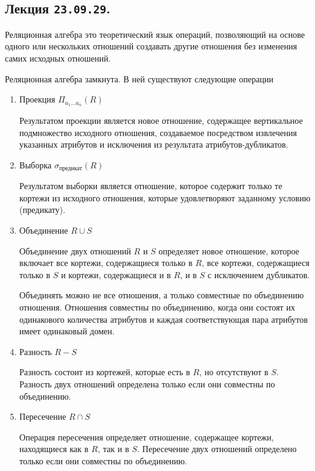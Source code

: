 \subsection{%
  Лекция \texttt{23.09.29}.%
}

\begin{definition}
  Реляционная алгебра это теоретический язык операций, позволяющий на основе
  одного или нескольких отношений создавать другие отношения без изменения самих
  исходных отношений.
\end{definition}

Реляционная алгебра замкнута. В ней существуют следующие операции

\begin{enumerate}
\item
  Проекция \(\Pi_{a_1 \dotsc a_n} (R)\)

  Результатом проекции является новое отношение, содержащее вертикальное
  подмножество исходного отношения, создаваемое посредством извлечения указанных
  атрибутов и исключения из результата атрибутов-дубликатов.

\item
  Выборка \(\sigma_{\text{предикат}} (R)\)

  Результатом выборки является отношение, которое содержит только те кортежи из
  исходного отношения, которые удовлетворяют заданному условию (предикату).

\item
  Объединение \(R \cup S\)

  Объединение двух отношений \(R\) и \(S\) определяет новое отношение, которое
  включает все кортежи, содержащиеся только в \(R\), все кортежи, содержащиеся
  только в \(S\) и кортежи, содержащиеся и в \(R\), и в \(S\) с исключением
  дубликатов.

  Объединять можно не все отношения, а только совместные по объединению
  отношения. Отношения совместны по объединению, когда они состоят их
  одинакового количества атрибутов и каждая соответствующая пара атрибутов имеет
  одинаковый домен.

\item
  Разность \(R - S\)

  Разность состоит из кортежей, которые есть в \(R\), но отсутствуют в \(S\).
  Разность двух отношений определена только если они совместны по объединению.

\item
  Пересечение \(R \cap S\)

  Операция пересечения определяет отношение, содержащее кортежи, находящиеся как
  в \(R\), так и в \(S\). Пересечение двух отношений определено только если они
  совместны по объединению.


\end{enumerate}
